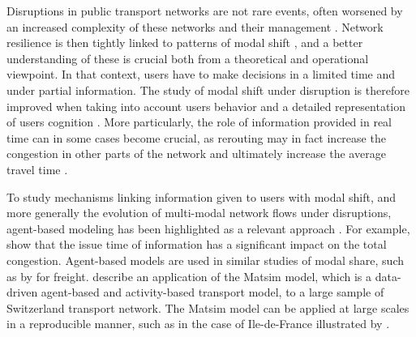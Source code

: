 \documentclass[3p,times,procedia]{elsarticle}
\begin{document}
Disruptions in public transport networks are not rare events, often worsened by an increased complexity of these networks and their management \citep{dekker2018next}. Network resilience is then tightly linked to patterns of modal shift \cite{stamos2015impact}, and a better understanding of these is crucial both from a theoretical and operational viewpoint. In that context, users have to make decisions in a limited time and under partial information. The study of modal shift under disruption is therefore improved when taking into account users behavior and a detailed representation of users cognition \citep{brisbois2010processus}. More particularly, the role of information provided in real time can in some cases become crucial, as rerouting may in fact increase the congestion in other parts of the network and ultimately increase the average travel time \citep{chatterjee2002driver,chorus2006travel}.


To study mechanisms linking information given to users with modal shift, and more generally the evolution of multi-modal network flows under disruptions, agent-based modeling has been highlighted as a relevant approach \citep{leng2020role}. For example, \cite{leng2020issue} show that the issue time of information has a significant impact on the total congestion. Agent-based models are used in similar studies of modal share, such as by \cite{baindur2011agent} for freight. \cite{raney2003agent} describe an application of the Matsim model, which is a data-driven agent-based and activity-based transport model, to a large sample of Switzerland transport network. The Matsim model can be applied at large scales in a reproducible manner, such as in the case of Ile-de-France illustrated by \cite{horl2020reproducible}.
\end{document}
